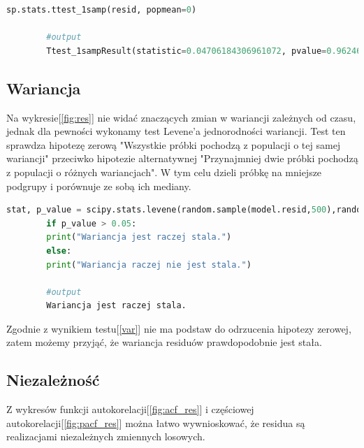 \documentclass{article}
\theoremstyle{break}
\begin{document}
	\begin{lstlisting}[language=Python, caption=Test t, label={srednia}]
		sp.stats.ttest_1samp(resid, popmean=0)
		
		#output
		Ttest_1sampResult(statistic=0.04706184306961072, pvalue=0.9624674462497231)\end{lstlisting}
	
	\subsection{Wariancja}
	Na wykresie[\ref{fig:res}] nie widać znaczących zmian w wariancji zależnych od czasu, jednak dla pewności wykonamy test Levene'a jednorodności wariancji. Test ten sprawdza hipotezę zerową "Wszystkie próbki pochodzą z populacji o tej samej wariancji" przeciwko hipotezie alternatywnej "Przynajmniej dwie próbki pochodzą z populacji o różnych wariancjach". W tym celu dzieli próbkę na mniejsze podgrupy i porównuje ze sobą ich mediany.
	
	\begin{lstlisting}[language=Python, caption=Test Levene'a, label={var}]
		stat, p_value = scipy.stats.levene(random.sample(model.resid,500),random.sample(model.resid,500))
		if p_value > 0.05:
		print("Wariancja jest raczej stala.")
		else:
		print("Wariancja raczej nie jest stala.")
		
		#output
		Wariancja jest raczej stala.\end{lstlisting}
	
	Zgodnie z wynikiem testu[\ref{var}] nie ma podstaw do odrzucenia hipotezy zerowej, zatem możemy przyjąć, że wariancja residuów prawdopodobnie jest stała.
	
	\subsection{Niezależność}
	Z wykresów funkcji autokorelacji[\ref{fig:acf_res}] i częściowej autokorelacji[\ref{fig:pacf_res}] można łatwo wywnioskować, że residua są realizacjami niezależnych zmiennych losowych.
	
\end{document}
